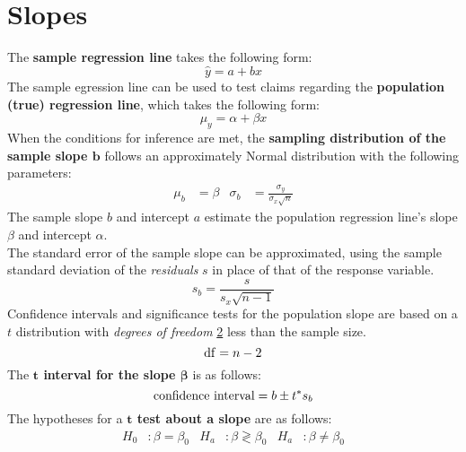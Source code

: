 \documentclass[../AP_Statistics.tex]{subfiles}
\begin{document}
	\chapter{Slopes}
		The \textbf{sample regression line} takes the following form:
		\[\hat{y} = a + bx\]
		The sample egression line can be used to test claims regarding the \textbf{population (true) regression line}, which takes the following form:
		\[\mu_y = \alpha + \beta x\]
		When the conditions for inference are met, the \textbf{sampling distribution of the sample slope $\bm{b}$} follows an approximately Normal distribution with the following parameters:
		\begin{align*}
			\mu_b &= \beta & \sigma_b &= \frac{\sigma_y}{\sigma_x\sqrt{n}}
		\end{align*}
		The sample slope $b$ and intercept $a$ estimate the population regression line's slope $\beta$ and intercept $\alpha$. \\
		The standard error of the sample slope can be approximated, using the sample standard deviation of the \emph{residuals} $s$ in place of that of the response variable.
		\[s_b = \frac{s}{s_x\sqrt{n - 1}}\]
		Confidence intervals and significance tests for the population slope are based on a $t$ distribution with \emph{degrees of freedom} \underline{2} less than the sample size.
		\[\operatorname{\mathrm{df}} = n - 2\]
		The \textbf{$\bm{t}$ interval for the slope $\bm{\beta}$} is as follows:
		\[\text{confidence interval} = b \pm t^*s_b\]
		The hypotheses for a \textbf{$\bm{t}$ test about a slope} are as follows:
		\begin{align*}
			H_0&: \beta = \beta_0 & H_a&: \beta \gtrless \beta_0 & H_a&: \beta \ne \beta_0
		\end{align*}
\end{document}
